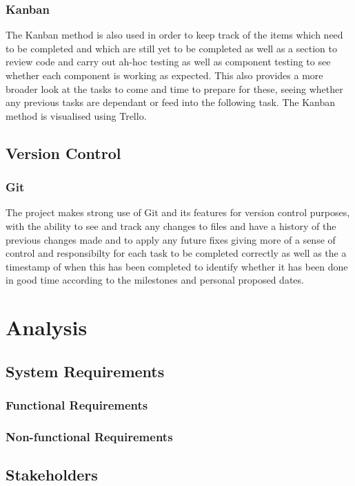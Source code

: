 \documentclass{report}
\begin{document}
		\subsection{Kanban}
The Kanban method is also used in order to keep track of the items which need to be completed and which are still yet to be completed as well as a section to review code and carry out ah-hoc testing as well as component testing to see whether each component is working as expected. This also provides a more broader look at the tasks to come and time to prepare for these, seeing whether any previous tasks are dependant or feed into the following task. The Kanban method is visualised using Trello.

	\section{Version Control}
		\subsection{Git}
The project makes strong use of Git and its features for version control purposes, with the ability to see and track any changes to files and have a history of the previous changes made and to apply any future fixes giving more of a sense of control and responsibilty for each task to be completed correctly as well as the a timestamp of when this has been completed to identify whether it has been done in good time according to the milestones and personal proposed dates.

\chapter{Analysis}
	\section{System Requirements}
		\subsection{Functional Requirements}
		\subsection{Non-functional Requirements}

\section{Stakeholders}
\end{document}
